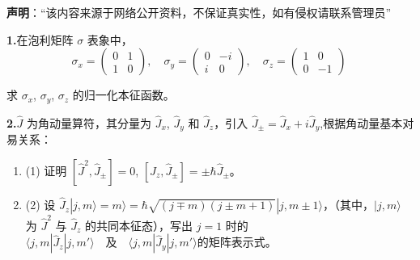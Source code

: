 
\textbf{声明}：“该内容来源于网络公开资料，不保证真实性，如有侵权请联系管理员”

\textbf{1.}在泡利矩阵 $\sigma$ 表象中，
$$\sigma_x = \begin{pmatrix}
0 & 1 \\
1 & 0
\end{pmatrix}, \quad
\sigma_y = \begin{pmatrix}
0 & -i \\
i & 0
\end{pmatrix}, \quad
\sigma_z = \begin{pmatrix}
1 & 0 \\
0 & -1
\end{pmatrix}~$$

求 $\sigma_x$, $\sigma_y$, $\sigma_z$ 的归一化本征函数。

\textbf{2.}$\hat{J}$ 为角动量算符，其分量为 $\hat J_x$, $\hat J_y$ 和 $\hat J_z$，引入 $\hat J_\pm = \hat J_x + i\hat J_y$,根据角动量基本对易关系：

\begin{enumerate}
    \item (1) 证明 $[\hat J^2, \hat J_{\pm}] = 0$, $[\hat J_z, \hat J_{\pm}] = \pm \hbar \hat J_{\pm}$。
    \item (2) 设 $\hat J_z |j, m\rangle = m\rangle = \hbar\sqrt{(j\mp m)(j\pm m+1)}|j, m\pm 1\rangle$，（其中，$|j,m\rangle$ 为 $\hat J^2$ 与 $\hat J_z$ 的共同本征态），写出 $j=1$ 时的 $\langle j, m | \hat J_z | j, m' \rangle \quad \text{及} \quad \langle j, m | \hat J_y | j, m' \rangle $的矩阵表示式。
\end{enumerate}
